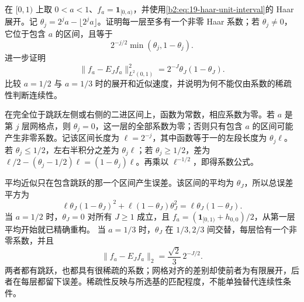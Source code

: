 \begin{optionalexercise}\label{b2:ex:19-haar-moving-jump}
在 \([0,1)\) 上取 \(0<a<1\)、\(f_a=\mathbf1_{[0,a)}\)，并使用\eqref{b2:eq:19-haar-unit-interval}的 Haar 展开。记
\(\theta_j=2^ja-\lfloor2^ja\rfloor\)。证明每一层至多有一个非零 Haar 系数；若 \(\theta_j\ne0\)，它位于包含 \(a\) 的区间，且等于
\[
 2^{-j/2}\min(\theta_j,1-\theta_j).
\]
进一步证明
\[
 \|f_a-E_Jf_a\|_{L^2(0,1)}^2
 =2^{-J}\theta_J(1-\theta_J).
\]
比较 \(a=1/2\) 与 \(a=1/3\) 时的展开和近似速度，并说明为何不能仅由系数的稀疏性判断连续性。
\end{optionalexercise}
\begin{solution}
在完全位于跳跃左侧或右侧的二进区间上，函数为常数，相应系数为零。若 \(a\) 是第 \(j\) 层网格点，则 \(\theta_j=0\)，这一层的全部系数为零；否则只有包含 \(a\) 的区间可能产生非零系数。记该区间长度为 \(\ell=2^{-j}\)，其中函数等于一的左段长度为 \(\theta_j\ell\)。若 \(\theta_j\leq1/2\)，左右半积分之差为 \(\theta_j\ell\)；若 \(\theta_j\geq1/2\)，差为
\(\ell/2-(\theta_j-1/2)\ell=(1-\theta_j)\ell\)。再乘以 \(\ell^{-1/2}\)，即得系数公式。

平均近似只在包含跳跃的那一个区间产生误差。该区间的平均为 \(\theta_J\)，所以总误差平方为
\[
 \ell\theta_J(1-\theta_J)^2
 +\ell(1-\theta_J)\theta_J^2
 =\ell\theta_J(1-\theta_J).
\]
当 \(a=1/2\) 时，\(\theta_J=0\) 对所有 \(J\geq1\) 成立，且
\(f_a=(\mathbf1_{[0,1)}+h_{0,0})/2\)，从第一层平均开始就已精确重构。
当 \(a=1/3\) 时，\(\theta_J\) 在 \(1/3,2/3\) 间交替，每层恰有一个非零系数，并且
\[
 \|f_a-E_Jf_a\|_2=\frac{\sqrt2}{3}\,2^{-J/2}.
\]
两者都有跳跃，也都具有很稀疏的系数；网格对齐的差别却使前者为有限展开，后者在每层都留下误差。稀疏性反映与所选基的匹配程度，不能单独替代连续性条件。
\end{solution}
